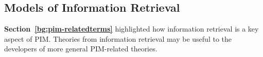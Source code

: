 
\subsection{Models of Information Retrieval}
\label{review:theory-pimmodels:ir}

\textbf{Section~\ref{bg:pim-relatedterms}} highlighted how information retrieval is a key aspect of PIM.  Theories from information retrieval may be useful to the developers of more general PIM-related theories.



